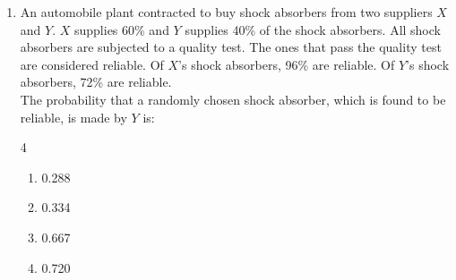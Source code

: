 \documentclass[journal]{IEEEtran}
\begin{document}
\begin{enumerate}
    \item[Q.65] An automobile plant contracted to buy shock absorbers from two suppliers $X$ and $Y$. $X$ supplies 60\% and $Y$ supplies 40\% of the shock absorbers. All shock absorbers are subjected to a quality test. The ones that pass the quality test are considered reliable. Of $X$'s shock absorbers, 96\% are reliable. Of $Y$'s shock absorbers, 72\% are reliable.\\

     The probability that a randomly chosen shock absorber, which is found to be reliable, is made by $Y$ is:
\begin{multicols}{4}
    

    \begin{enumerate}
        \item 0.288
        \item 0.334
        \item 0.667
        \item 0.720
    \end{enumerate}
    \end{multicols}

     
    
\end{enumerate}
\end{document}
